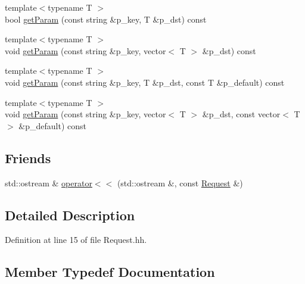 \begin{DoxyCompactItemize}
\item 
{\footnotesize template$<$typename T $>$ }\\bool \hyperlink{classxtd_1_1network_1_1http_1_1Request_a2d7c1f674b8935120f6f20cd6baccd63}{get\+Param} (const string \&p\+\_\+key, T \&p\+\_\+dst) const 
\item 
{\footnotesize template$<$typename T $>$ }\\void \hyperlink{classxtd_1_1network_1_1http_1_1Request_a00b5483c07f655a7a2b40a4db8190a1e}{get\+Param} (const string \&p\+\_\+key, vector$<$ T $>$ \&p\+\_\+dst) const 
\item 
{\footnotesize template$<$typename T $>$ }\\void \hyperlink{classxtd_1_1network_1_1http_1_1Request_a1c75bacd611d64713664efb796f33d25}{get\+Param} (const string \&p\+\_\+key, T \&p\+\_\+dst, const T \&p\+\_\+default) const 
\item 
{\footnotesize template$<$typename T $>$ }\\void \hyperlink{classxtd_1_1network_1_1http_1_1Request_ac3b9fbaba2751dfaa8f028e31f53c0f9}{get\+Param} (const string \&p\+\_\+key, vector$<$ T $>$ \&p\+\_\+dst, const vector$<$ T $>$ \&p\+\_\+default) const 
\end{DoxyCompactItemize}
\subsection*{Friends}
\begin{DoxyCompactItemize}
\item 
std\+::ostream \& \hyperlink{classxtd_1_1network_1_1http_1_1Request_a4ef55dada327d66bc23474520e1ae32c}{operator$<$$<$} (std\+::ostream \&, const \hyperlink{classxtd_1_1network_1_1http_1_1Request}{Request} \&)
\end{DoxyCompactItemize}


\subsection{Detailed Description}


Definition at line 15 of file Request.\+hh.



\subsection{Member Typedef Documentation}
